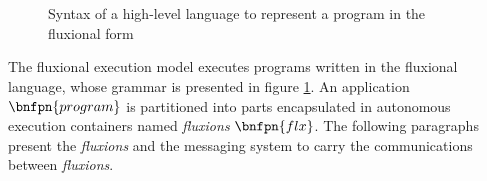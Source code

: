 \begin{figure}[h]
\vspace{-0.6\baselineskip}
\begin{bnf*}
      { \bnfor {} \bnfsp {} \bnfsp {}}\\
          { \bnfsp {} \bnfsp {} \bnfsp {} \bnfsp {} \bnfsp {} \bnfsp {} \bnfsp {}}\\
         {\bnfts{\texttt{\&}} \bnfsp {} \bnfor {}}\\
      { \bnfor {} \bnfor {} \bnfsp {} \bnfsp {}}\\
       { \bnfsp {} }\\
         {}\\
          {\bnfts{\texttt{\{}}  \bnfts{\texttt{\}}}}\\
          {\bnfts{\texttt{[}}  \bnfts{\texttt{]}}}\\
         { \bnfor {} \bnfsp \bnfts{,} \bnfsp {}}\\
         {\bnfts{\texttt{>}\texttt{>}} \bnfor \bnfts{\texttt{-}\texttt{>}}}\\
           {}\\
           {  }\\
\end{bnf*}
\vspace{-2.5\baselineskip}
\caption{Syntax of a high-level language to represent a program in the fluxional form}
\label{fig:flx-lang}
\end{figure}

The fluxional execution model executes programs written in the fluxional language, whose grammar is presented in figure \ref{fig:flx-lang}.
An application $\bnfpn{program}$ is partitioned into parts encapsulated in autonomous execution containers named \textit{fluxions} $\bnfpn{flx}$.
The following paragraphs present the \textit{fluxions} and the messaging system to carry the communications between \textit{fluxions}.


